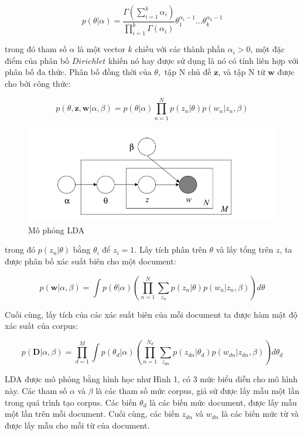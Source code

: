 \documentclass[12pt,a4paper]{article}
\begin{document}
\begin{equation} \label{eq:1}
p(\theta | \alpha) = \dfrac{\Gamma (\sum_{i=1}^{k} {\alpha}_i)}{\prod_{i=1}^{k} \Gamma ({\alpha}_i)} {\theta}_{1}^{{\alpha}_1 - 1}...{\theta}_{k}^{{\alpha}_k - 1}
\end{equation} 


trong đó tham số $\alpha$ là một vector $k$ chiều với các thành phần ${\alpha}_i > 0$, một đặc điểm của phân bố $Dirichlet$ khiến nó hay được sử dụng là nó có tính liên hợp với phân bố đa thức. Phân bố đồng thời của $\theta,$ tập N chủ đề $\textbf{z}$, và tập N từ $\textbf{w}$ được cho bởi công thức:

\begin{equation} \label{eq:2}
p(\theta, \textbf{z}, \textbf{w} | \alpha, \beta) = p(\theta | \alpha) \prod_{n = 1}^{N} p(z_n | \theta)p(w_n | z_n, \beta)
\end{equation} 

\begin{figure}[h]
    \centering
    \includegraphics[width=.6\textwidth]{lda}
    \caption{Mô phỏng LDA}
    \label{fig:lda}
\end{figure}
\noindent
trong đó $p(z_n| \theta)$ bằng ${\theta}_i$ để $z_i = 1$. Lấy tích phân trên $\theta$ và lấy tổng trên $z$, ta được phân bố xác suất biên cho một document:

\begin{equation} \label{eq:3}
p(\textbf{w} | \alpha, \beta) = \int p({\theta}| \alpha) \left( \prod_{n=1}^{N} \sum_{z_n} p(z_n | \theta) p(w_n | z_n, \beta) \right)d\theta
\end{equation}

\noindent
Cuối cùng, lấy tích của các xác suất biên của mỗi document ta được hàm mật độ xác suất của corpus:

\begin{equation} 
p(\textbf{D} | \alpha, \beta) = \prod_{d=1}^{M} \int p({\theta}_d | \alpha) \left( \prod_{n=1}^{N_d} \sum_{z_{dn}} p(z_{dn} | {\theta}_d)p(w_{dn} | z_{dn}, \beta) \right) d{\theta}_d
\end{equation}

LDA được mô phỏng bằng hình học như Hình 1, có 3 mức biểu diễn cho mô hình này. Các tham số $\alpha$ và $\beta$ là các tham số mức corpus, giả sử được lấy mẫu một lần trong quá trình tạo corpus. Các biến ${\theta}_d$ là các biến mức document, được lấy mẫu một lần trên mỗi document. Cuối cùng, các biến $z_{dn}$ và $w_{dn}$ là các biến mức từ và được lấy mẫu cho mỗi từ của document.
\end{document}
